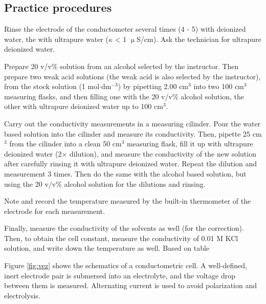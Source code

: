 \subsection{Practice procedures}

Rinse the electrode of the conductometer several times (4 - 5) with deionized water, the with ultrapure water ($\kappa$ < 1 $\upmu$S/cm). Ask the technician for ultrapure deionized water.

Prepare 20 v/v\% solution from an alcohol selected by the instructor. Then prepare two weak acid solutions (the weak acid is also selected by the instructor), from the stock solution (1 mol$\cdot$dm$^{-3}$) by pipetting 2.00 cm$^3$ into two 100 cm$^3$ measuring flasks, and then filling one with the 20 v/v\% alcohol solution, the other with ultrapure deionized water up to 100 cm$^3$.

Carry out the conductivity measurements in a measuring cilinder. Pour the water based solution into the cilinder and measure its conductivity. Then, pipette 25 cm$^3$ from the cilinder into a clean 50 cm$^3$ measuring flask, fill it up with ultrapure deionized water (2$\times$ dilution), and measure the conductivity of the new solution after carefully rinsing it with ultrapure deionized water. Repeat the dilution and measurement 3 times. Then do the same with the alcohol based solution, but using the 20 v/v\% alcohol solution for the dilutions and rinsing.

Note and record the temperature measured by the built-in thermometer of the electrode for each measurement.

Finally, measure the conductivity of the solvents as well (for the correction).
Then, to obtain the cell constant, measure the conductivity of 0.01 M KCl solution, and write down the temperature as well. Based on table 

Figure \ref{fig:vez} shows the schematics of a conductometric cell. A well-defined, inert electrode pair is submersed into an electrolyte, and the voltage drop between them is measured. Alternating current is used to avoid polarization and electrolysis.

